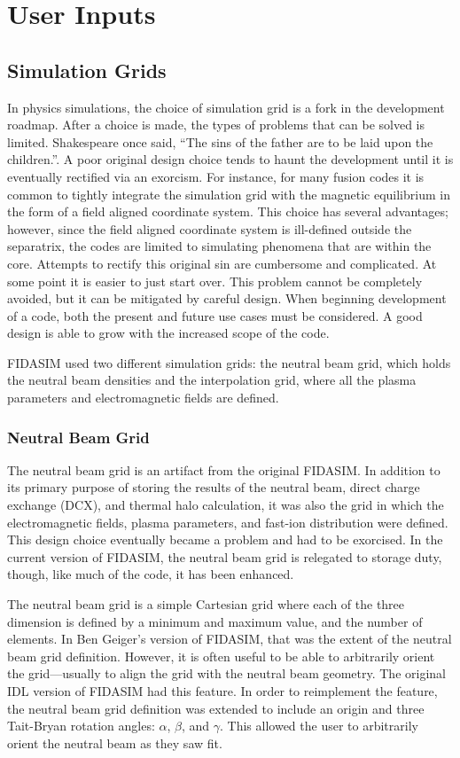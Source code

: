 \section{User Inputs}
\subsection{Simulation Grids}
In physics simulations, the choice of simulation grid is a fork in the development roadmap. After a choice is made, the types of problems that can be solved is limited. Shakespeare once said, “The sins of the father are to be laid upon the children.”. A poor original design choice tends to haunt the development until it is eventually rectified via an exorcism. For instance, for many fusion codes it is common to tightly integrate the simulation grid with the magnetic equilibrium in the form of a field aligned coordinate system. This choice has several advantages; however, since the field aligned coordinate system is ill-defined outside the separatrix, the codes are limited to simulating phenomena that are within the core. Attempts to rectify this original sin are cumbersome and complicated. At some point it is easier to just start over. 
This problem cannot be completely avoided, but it can be mitigated by careful design. When beginning development of a code, both the present and future use cases must be considered. A good design is able to grow with the increased scope of the code.

FIDASIM used two different simulation grids: the neutral beam grid, which holds the neutral beam densities and the interpolation grid, where all the plasma parameters and electromagnetic fields are defined.
\subsubsection{Neutral Beam Grid}
The neutral beam grid is an artifact from the original FIDASIM. In addition to its primary purpose of storing the results of the neutral beam, direct charge exchange (DCX), and thermal halo calculation, it was also the grid in which the electromagnetic fields, plasma parameters, and fast-ion distribution were defined. This design choice eventually became a problem and had to be exorcised. In the current version of FIDASIM, the neutral beam grid is relegated to storage duty, though, like much of the code, it has been enhanced.

The neutral beam grid is a simple Cartesian grid where each of the three dimension is defined by a minimum and maximum value, and the number of elements. In Ben Geiger's version of FIDASIM, that was the extent of the neutral beam grid definition. However, it is often useful to be able to arbitrarily orient the grid---usually to align the grid with the neutral beam geometry. The original IDL version of FIDASIM had this feature. In order to reimplement the feature, the neutral beam grid definition was extended to include an origin and three Tait-Bryan rotation angles: $\alpha$, $\beta$, and $\gamma$. This allowed the user to arbitrarily orient the neutral beam as they saw fit.

